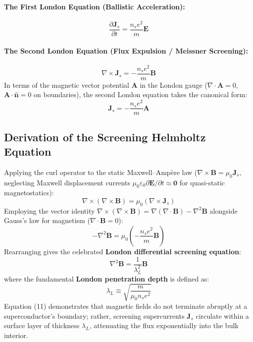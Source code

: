 \documentclass[11pt,a4paper]{article}
\begin{document}
\paragraph{The First London Equation (Ballistic Acceleration):}
\begin{equation}
    \frac{\partial \mathbf{J}_s}{\partial t} = \frac{n_s e^2}{m} \mathbf{E}
\end{equation}

\paragraph{The Second London Equation (Flux Expulsion / Meissner Screening):}
\begin{equation}
    \nabla \times \mathbf{J}_s = -\frac{n_s e^2}{m} \mathbf{B}
\end{equation}
In terms of the magnetic vector potential $\mathbf{A}$ in the London gauge ($\nabla \cdot \mathbf{A} = 0$, $\mathbf{A} \cdot \hat{\mathbf{n}} = 0$ on boundaries), the second London equation takes the canonical form:
\begin{equation}
    \mathbf{J}_s = -\frac{n_s e^2}{m} \mathbf{A}
\end{equation}

\subsection{Derivation of the Screening Helmholtz Equation}
Applying the curl operator to the static Maxwell--Amp\`ere law ($\nabla \times \mathbf{B} = \mu_0 \mathbf{J}_s$, neglecting Maxwell displacement currents $\mu_0 \varepsilon_0 \partial \mathbf{E}/\partial t \approx \mathbf{0}$ for quasi-static magnetostatics):
\begin{equation}
    \nabla \times (\nabla \times \mathbf{B}) = \mu_0 (\nabla \times \mathbf{J}_s)
\end{equation}
Employing the vector identity $\nabla \times (\nabla \times \mathbf{B}) = \nabla(\nabla \cdot \mathbf{B}) - \nabla^2 \mathbf{B}$ alongside Gauss's law for magnetism ($\nabla \cdot \mathbf{B} = 0$):
\begin{equation}
    -\nabla^2 \mathbf{B} = \mu_0 \left( -\frac{n_s e^2}{m} \mathbf{B} \right)
\end{equation}
Rearranging gives the celebrated \textbf{London differential screening equation}:
\begin{equation}
    \nabla^2 \mathbf{B} = \frac{1}{\lambda_L^2} \mathbf{B}
\end{equation}
where the fundamental \textbf{London penetration depth} is defined as:
\begin{equation}
    \lambda_L \equiv \sqrt{\frac{m}{\mu_0 n_s e^2}}
\end{equation}
Equation (11) demonstrates that magnetic fields do not terminate abruptly at a superconductor's boundary; rather, screening supercurrents $\mathbf{J}_s$ circulate within a surface layer of thickness $\lambda_L$, attenuating the flux exponentially into the bulk interior.
\end{document}
